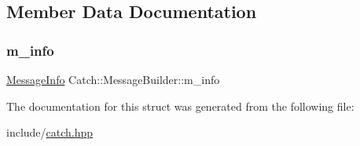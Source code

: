 \subsection{Member Data Documentation}
\mbox{\label{struct_catch_1_1_message_builder_a979f1c2b36d78f80ee275bfa5ba0209f}} 
\subsubsection{\texorpdfstring{m\_info}{m\_info}}
{\footnotesize\ttfamily \mbox{\hyperlink{struct_catch_1_1_message_info}{Message\+Info}} Catch\+::\+Message\+Builder\+::m\+\_\+info}



The documentation for this struct was generated from the following file\+:\begin{DoxyCompactItemize}
\item 
include/\mbox{\hyperlink{catch_8hpp}{catch.\+hpp}}\end{DoxyCompactItemize}

